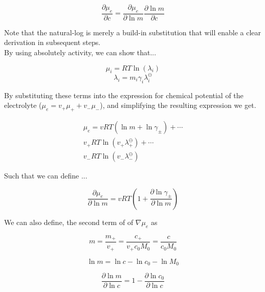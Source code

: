 \documentclass[lettersize,journal]{IEEEtran}
\begin{document}
\begin{equation}
\frac{\partial \mu_{e}}{\partial c}=\frac{\partial \mu_{e}}{\partial \ln m} \frac{\partial \ln m}{\partial c}
\end{equation}

Note that the natural-log is merely a build-in substitution that will enable a clear derivation in subsequent steps. \\

By using absolutely activity, we can show that...

\begin{equation}
\mu_{i}=R T \ln \left(\lambda_{i}\right)
\end{equation}
\begin{equation}
\lambda_{i}=m_{i} \gamma_{i} \lambda_{i}^{\ominus}
\end{equation}


By substituting these terms into the expression for chemical potential of the electrolyte ($\mu_{e}=v_{+} \mu_{+}+v_{-} \mu_{-} $), and simplifying the resulting expression we get.

\begin{equation}
\begin{aligned}
\mu_{e}= v R T\left(\ln m+\ln \gamma_{\pm}\right)+ \cdots \\
v_{+} R T \ln \left(v_{+} \lambda_{+}^{\ominus}\right)+ \cdots \\
v_{-} R T \ln \left(v_{-} \lambda_{-}^{\ominus}\right)
\end{aligned}
\end{equation}

Such that we can define ...

\begin{equation}
\frac{\partial \mu_{e}}{\partial \ln m}=v R T\left(1+\frac{\partial \ln \gamma_{\pm}}{\partial \ln m}\right)
\end{equation}


We can also define, the second term of of $\nabla \mu_e$ as


\begin{equation}
m=\frac{m_{+}}{v_{+}}=\frac{c_{+}}{v_{+} c_{0} M_{0}}=\frac{c}{c_{0} M_{0}}
\end{equation}


\begin{equation}
\ln m=\ln c-\ln c_{0}-\ln M_{0}
\end{equation}

\begin{equation}
\frac{\partial \ln m}{\partial \ln c}=1-\frac{\partial \ln c_{0}}{\partial \ln c}
\end{equation}
\end{document}
